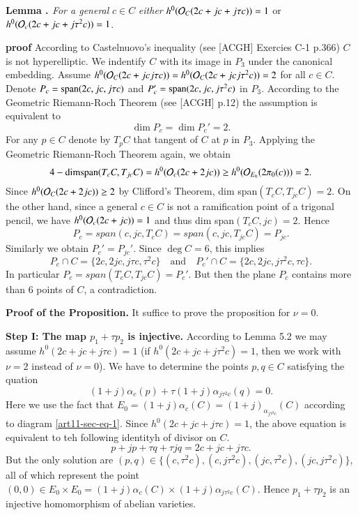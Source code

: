 \medskip
\noindent
{\bfseries {} Lemma . \label{art11-lemma-5.2}} \textit{For a general} $c\in C$ \textit{either} $h^{0}(\mathcal{O}_{C}(2c + jc +j \tau c)) =1$ or $h^{0}(\mathcal{O}_{c}(2c +jc +j\tau^{2}c))=1$.

\medskip
\noindent
{\bfseries proof} According to Castelnuovo's inequality (see [ACGH] Exercies C-1 p.366) $C$ is not hyperelliptic. We indentify $C$ with its image in $P_{3}$ under the canonical embedding. Assume $h^{0}(\mathcal{O}_{C}(2c +jc j\tau c)) = h^{0}(\mathcal{O}_{C}(2c +jc j\tau^{2} c)) =2$ for all $c \in C$. Denote $P_{c}={\rm span}(2c,jc, j\tau c)$ and $P_{c}'={\rm span}(2c, jc, j\tau^{2}c)$ in $P_{3}$. According to the Geometric Riemann-Roch Theorem (see [ACGH] p.12) the assumption is equivalent to
$$
\dim P_{c} =\dim P_{c}' =2.
$$ 
For any $p \in C$ denote by $T_{p}C$ that tangent of $C$ at $p$ in $P_{3}$. Applying the Geometric Riemann-Roch Theorem again, we obtain
$$
4-{\rm dim span} (T_{c}C, T_{jc}C)=h^{0}(\mathcal{O}_{c}(2c +2jc))\geq h^{0}(\mathcal{O}_{E_{0}}(2\pi_{0}(c)))=2.
$$
Since $h^{0}(\mathcal{O}_{C}(2c +2jc))\geq 2 $ by Clifford's Theorem, dim span$(T_{c}C, T_{jc}C) = 2$. On the other hand, since a general $c\in C$ is not a ramification point of a trigonal pencil, we have $h^{0}(\mathcal{O}_{c}(2c + jc))=1$ and thus dim span$(T_{c}C, jc)=2$. Hence
$$
P_{c} = span(c, jc, T_{c}C)= span(c, jc,T_{jc}C)=P_{jc}.
$$
Similarly we obtain $P_{c}'=P_{jc}'$. Since $\deg C =6$, this implies
$$
P_{c}\cap C= \{2c,2jc, j\tau c, \tau^{2}c\} \quad \text{and} \quad P_{c}'\cap C = \{2c, 2jc,j\tau^{2}c, \tau c\}.
$$
In particular $P_{c}= span (T_{c}C, T_{jc}C)= P_{c}'$. But then the plane $P_{c}$ contains more than 6 points of $C$, a contradiction.

\medskip
\noindent
{\bfseries Proof of the Proposition.} It suffice  to prove the proposition for $\nu =0$.

\medskip
\noindent
{\bfseries Step I: The map $p_{1} + \tau p_{2}$ is injective.} According to Lemma 5.2 we may assume $h^{0}(2c +jc +j \tau c) =1$ (if $h^{0}(2c + jc +j\tau^{2}c)=1$, then we work with $\nu=2$ instead of $\nu =0$). We have to determine the points $p,q\in C$ satisfying the quation
$$
(1 +j)\alpha_{c}(p) + \tau(1+j)\alpha_{j\tau^{2}c}(q)=0.
$$
Here we use the fact that $ E_{0}=(1 +j)\alpha_{c}(C)=(1+j)_{\alpha_{j\tau^{2}c}}(C)$ according to diagram \eqref{art11-sec-eq-1}. Since $h^{0}(2c +jc +j\tau c)=1$, the above equation is equivalent to teh following identityh of divisor on $C$.
$$
p +jp + \tau q + \tau jq =2c +jc  +j\tau c.
$$
But the only solution are $(p,q) \in \{(c,\tau^{2}c), (c, j\tau^{2}c), (jc,\tau^{2}c),(jc,j\tau^{2}c)\}$, all of which represent the point $(0,0) \in E_{0} \times E_{0} =(1 +j)\alpha_{c}(C)\times (1 +j)\alpha_{j\tau^{2}c}(C)$.
Hence $p_{1} +\tau p_{2}$ is an injective homomorphism of abelian varieties.

